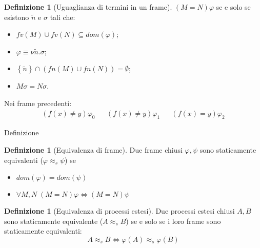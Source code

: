 \documentclass{beamer}
\newcounter{counter1}
\theoremstyle{plain}
\theoremstyle{definition}
\newtheorem{mydef}[counter1]{Definizione}
\theoremstyle{remark}
\newcommand{\set}[1]{\left\{#1\right\}}
\begin{document}
\begin{frame}
  \begin{mydef}[Uguaglianza di termini in un frame]
    $(M=N)\varphi$ se e solo se esistono $\tilde n$ e $\sigma$ tali che:
    \begin{itemize}
    \item $fv(M) \cup fv(N) \subseteq dom(\varphi)$;
    \item $\varphi \equiv \nu \tilde n.\sigma$;
    \item $\set{\tilde n} \cap( fn(M) \cup fn(N)) = \emptyset$;
    \item $M\sigma = N\sigma$.
    \end{itemize}
  \end{mydef}
  \vfill
  
  Nei frame precedenti:
  \begin{align*}
    (f(x) \neq y)\varphi _0 && (f(x) \neq y)\varphi _1 && (f(x) =
                                                        y)\varphi _2
  \end{align*}
\end{frame}

\begin{frame}{Definizione}
  \begin{mydef}[Equivalenza di frame]
    Due frame chiusi $\varphi, \psi$ sono staticamente equivalenti
    ($\varphi \approx _s \psi$) se
    \begin{itemize}
    \item $dom(\varphi) = dom(\psi)$
    \item $\forall M,N\; (M=N)\varphi \Leftrightarrow (M=N)\psi$
    \end{itemize}
  \end{mydef}

  \begin{mydef}[Equivalenza di processi estesi]
    Due processi estesi chiusi $A,B$ sono staticamente equivalente
    ($A \approx_s B$) se e solo se i loro frame sono staticamente
    equivalenti:
    \[ A \approx _s B \Leftrightarrow \varphi(A) \approx _s \varphi(B) \]
  \end{mydef}
\end{frame}
\end{document}
